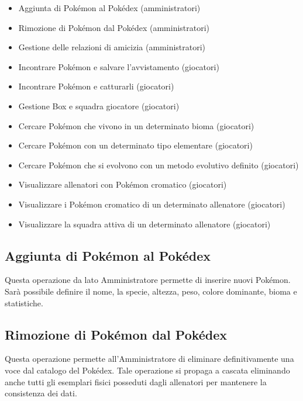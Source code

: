 \documentclass[a4paper,12pt]{report}
\begin{document}
\begin{itemize}

\item Aggiunta di Pokémon al Pokédex (amministratori) 
\item Rimozione di Pokémon dal Pokédex (amministratori) 
\item Gestione delle relazioni di amicizia (amministratori)

\item Incontrare Pokémon e salvare l'avvistamento (giocatori)
\item Incontrare Pokémon e catturarli (giocatori)
\item Gestione Box e squadra giocatore (giocatori)

\item Cercare Pokémon che vivono in un determinato bioma (giocatori)
\item Cercare Pokémon con un determinato tipo elementare (giocatori)
\item Cercare Pokémon che si evolvono con un metodo evolutivo definito (giocatori)

\item Visualizzare allenatori con Pokémon cromatico (giocatori)
\item Visualizzare i Pokémon cromatico di un determinato allenatore (giocatori)
\item Visualizzare la squadra attiva di un determinato allenatore (giocatori)

\end{itemize}

\subsection{Aggiunta di Pokémon al Pokédex}

Questa operazione da lato Amministratore permette di inserire nuovi Pokémon. Sarà possibile definire il nome, la specie, altezza, peso, colore dominante, bioma e statistiche.

\subsection{Rimozione di Pokémon dal Pokédex}

Questa operazione permette all'Amministratore di eliminare definitivamente una voce dal catalogo del Pokédex. Tale operazione si propaga a cascata eliminando anche tutti gli esemplari fisici posseduti dagli allenatori per mantenere la consistenza dei dati.
\end{document}
